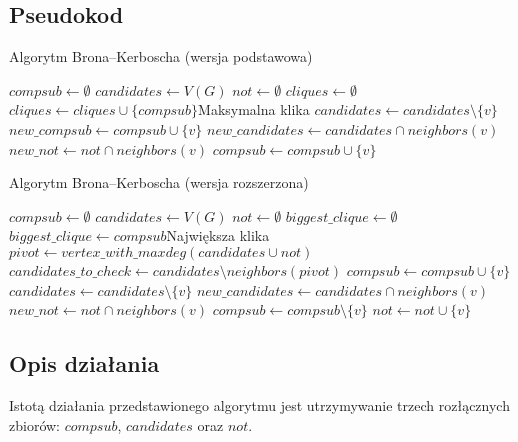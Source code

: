 \documentclass[12pt, a4paper]{article}
\begin{document}
\subsection{Pseudokod}
\begin{algorithm}[!htb]
\caption{Algorytm Brona--Kerboscha (wersja podstawowa)}\label{bron1}
\begin{algorithmic}[1]
\State $compsub \gets \emptyset$
\State $candidates \gets V(G)$
\State $not \gets \emptyset$
\State $cliques \gets \emptyset$
		 \State $cliques \gets cliques \cup \{compsub\}$\Comment Maksymalna klika
	\Else
		\State $candidates \gets candidates \setminus \{v\}$
		\State $new\_compsub \gets compsub \cup \{v\}$
		\State $new\_candidates \gets candidates \cap neighbors(v)$
		\State $new\_not \gets not \cap neighbors(v)$
		\State{}
		\State $compsub \gets compsub \cup \{v\}$
	\EndFor
	\EndIf
\EndFunction
\end{algorithmic}
\end{algorithm}

\begin{algorithm}[!htb]
\caption{Algorytm Brona--Kerboscha (wersja rozszerzona)}\label{bron2}
\begin{algorithmic}[1]
\State $compsub \gets \emptyset$
\State $candidates \gets V(G)$
\State $not \gets \emptyset$
\State $biggest\_clique \gets \emptyset$
		 	\State $biggest\_clique \gets compsub$\Comment Największa klika
		 \EndIf
	\Else
	\State $pivot \gets vertex\_with\_maxdeg(candidates \cup not)$
	\State $candidates\_to\_check \gets candidates \setminus neighbors(pivot)$
		\State $compsub \gets compsub \cup \{v\}$
		\State $candidates \gets candidates \setminus \{v\}$
		\State $new\_candidates \gets candidates \cap neighbors(v)$
		\State $new\_not \gets not \cap neighbors(v)$
		\State{}
		\State $compsub \gets compsub \setminus \{v\}$
		\State $not \gets not \cup \{v\}$
	\EndFor
	\EndIf
\EndFunction
\end{algorithmic}
\end{algorithm}

\newpage
\subsection{Opis działania}
Istotą działania przedstawionego algorytmu jest utrzymywanie trzech rozłącznych zbiorów: $compsub$, $candidates$ oraz $not$.
\end{document}
